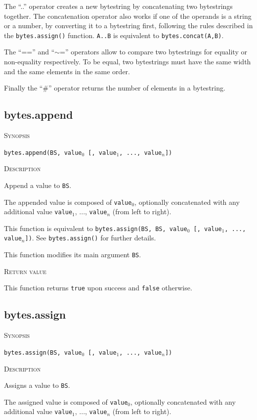 \documentclass[11pt]{report}
\newcommand{\mansection}[1]{\vspace{0.5em}\par\noindent\textsc{#1}\vspace{0.5em}\par}
\newcommand{\syn}[1]{\texttt{#1}}
\begin{document}
The ``..'' operator creates a new bytestring by concatenating two bytestrings together.
The concatenation operator also works if one of the operands is a string or a number, 
by converting it to a bytestring first, following the rules described in the 
\syn{bytes.assign()} function. 
\syn{A..B} is equivalent to \syn{bytes.concat(A,B)}.
  
The ``=='' and ``$\sim$='' operators allow to compare two bytestrings for equality or
non-equality respectively. To be equal, two bytestrings must have the same width
and the same elements in the same order.
 
Finally the ``\#'' operator returns the number of elements in a bytestring.

\subsection{bytes.append}

\mansection{Synopsis}

\syn{bytes.append(BS, value$_0$ [, value$_1$, ..., value$_n$])}

\mansection{Description}

Append a value to \syn{BS}.

The appended value is composed of \syn{value$_0$}, optionally concatenated with
any additional value \syn{value$_1$}, ..., \syn{value$_n$} (from left to right).

This function is equivalent to 
\syn{bytes.assign(BS, BS, \syn{value$_0$} [, \syn{value$_1$}, ..., \syn{value$_n$}])}.
See \syn{bytes.assign()} for further details.

This function modifies its main argument \syn{BS}.

\mansection{Return value}

This function returns \syn{true} upon success and \syn{false} otherwise.

\subsection{bytes.assign}

\mansection{Synopsis}
\syn{bytes.assign(BS, \syn{value$_0$} [, \syn{value$_1$}, ..., \syn{value$_n$}])}

\mansection{Description}

  Assigns a value to \syn{BS}. 

  The assigned value is composed of \syn{value$_0$}, optionally concatenated with 
  any additional value \syn{value$_1$}, ..., \syn{value$_n$} (from left to right).
\end{document}
